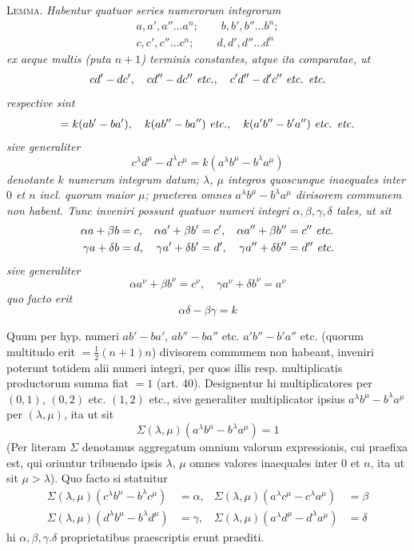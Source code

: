 \textsc{Lemma.} \textit{Habentur quatuor series numerorum integrorum}
\[
\begin{gathered}a,a',a''\ldots a^n;\qquad b,b',b''\ldots b^n;\\c,c',c''\ldots c^n;\qquad d,d',d''\ldots d^n\end{gathered}
\]
\textit{ex aeque multis (puta $n+1$) terminis constantes, atque ita comparatae, ut}
\[
cd'-dc',\quad cd''-dc''\ \text{\textit{etc.}},\quad c'd''-d'c''\ \text{\textit{etc. etc.}}
\]
\textit{respective sint}
\[
=k(ab'-ba'),\quad k(ab''-ba'')\ \text{\textit{etc.}},\quad k(a'b''-b'a'')\ \text{\textit{etc. etc.}}
\]
\textit{sive generaliter}
\[
c^\lambda d^\mu-d^\lambda c^\mu=k(a^\lambda b^\mu-b^\lambda a^\mu)
\]
\textit{denotante $k$ numerum integrum datum; $\lambda$, $\mu$ integros quoscunque inaequales inter $0$ et $n$ incl. quorum maior $\mu$}\textit{; praeterea omnes $a^\lambda b^\mu-b^\lambda a^\mu$ divisorem communem non habent. Tunc inveniri possunt quatuor numeri integri $\alpha,\beta,\gamma,\delta$ tales, ut sit}
\[
\begin{aligned}
\alpha a+\beta b&=c, &\alpha a'+\beta b'&=c', &\alpha a''+\beta b''&=c''\ \text{\textit{etc.}}\\
\gamma a+\delta b&=d, &\gamma a'+\delta b'&=d', &\gamma a''+\delta b''&=d''\ \text{\textit{etc.}}
\end{aligned}
\]
\textit{sive generaliter}
\[
\alpha a^\nu+\beta b^\nu=c^\nu,\quad\gamma a^\nu+\delta b^\nu=a^\nu
\]
\textit{quo facto erit}
\[
\alpha\delta-\beta\gamma=k
\]

Quum per hyp. numeri $ab'-ba'$, $ab''-ba''$ etc. $a'b''-b'a''$ etc. (quorum multitudo erit $=\frac12(n+1)n$) divisorem communem non habeant, inveniri poterunt totidem alii numeri integri, per quos illis resp. multiplicatis productorum summa fiat $=1$ (art. 40). Designentur hi multiplicatores per $(0,1)$, $(0,2)$ etc. $(1,2)$ etc., sive generaliter multiplicator ipsius $a^\lambda b^\mu-b^\lambda a^\mu$ per $(\lambda,\mu)$, ita ut sit
\[
\Sigma(\lambda,\mu)(a^\lambda b^\mu-b^\lambda a^\mu)=1
\]
(Per literam $\Sigma$ denotamus aggregatum omnium valorum expressionis, cui praefixa
est, qui oriuntur tribuendo ipsis $\lambda$, $\mu$ omnes valores inaequales inter $0$ et $n$, ita ut sit $\mu>\lambda$). Quo facto si statuitur
\[
\begin{aligned}
\Sigma(\lambda,\mu)(c^\lambda b^\mu-b^\lambda c^\mu)&=\alpha, &\Sigma(\lambda,\mu)(a^\lambda c^\mu-c^\lambda a^\mu)&=\beta\\
\Sigma(\lambda,\mu)(d^\lambda b^\mu-b^\lambda d^\mu)&=\gamma, &\Sigma(\lambda,\mu)(a^\lambda d^\mu-d^\lambda a^\mu)&=\delta
\end{aligned}
\]
hi $\alpha,\beta,\gamma.\delta$ proprietatibus praescriptis erunt praediti.

